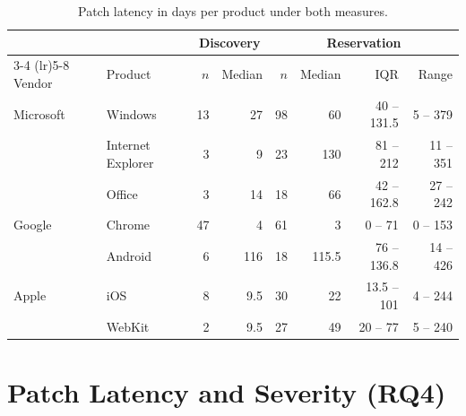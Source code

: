 \begin{table}[h]
    \centering
    \caption{Patch latency in days per product under both measures.}
    \label{tab:products}
    \small
    \setlength{\tabcolsep}{4pt}
    \begin{tabular}{llrrrrrr}
        \toprule
        & & \multicolumn{2}{c}{Discovery} & \multicolumn{4}{c}{Reservation} \\
        \cmidrule(lr){3-4} \cmidrule(lr){5-8}
        Vendor & Product & $n$ & Median & $n$ & Median & IQR & Range \\
        \midrule
        Microsoft & Windows           & 13 & 27 & 98 & 60 & 40 -- 131.5 & 5 -- 379 \\
                  & Internet Explorer & 3 & 9 & 23 & 130 & 81 -- 212 & 11 -- 351 \\
                  & Office            & 3 & 14 & 18 & 66 & 42 -- 162.8 & 27 -- 242 \\
        \addlinespace
        Google    & Chrome            & 47 & 4 & 61 & 3 & 0 -- 71 & 0 -- 153 \\
                  & Android           & 6 & 116 & 18 & 115.5 & 76 -- 136.8 & 14 -- 426 \\
        \addlinespace
        Apple     & iOS               & 8 & 9.5 & 30 & 22 & 13.5 -- 101 & 4 -- 244 \\
                  & WebKit            & 2 & 9.5 & 27 & 49 & 20 -- 77 & 5 -- 240 \\
        \bottomrule
    \end{tabular}
\end{table}

\section{Patch Latency and Severity (RQ4)}

